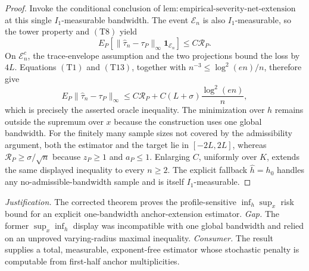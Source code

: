 \documentclass{article}
\begin{document}
\begin{proof}
Invoke the conditional conclusion of
\(\mathrm{lem{:}empirical\text{-}severity\text{-}net\text{-}extension}\)
at this single \(I_1\)-measurable bandwidth.  The event \(\mathcal E_n\) is
also \(I_1\)-measurable, so the tower property and \((\mathrm{T8})\) yield
\[
 E_P\!\left[\|\widehat\tau_n-\tau_P\|_\infty
 \mathbf1_{\mathcal E_n}\right]
 \leq C\mathcal R_P.
 \tag{T13}
\]
On \(\mathcal E_n^c\), the trace-envelope assumption and the two
projections bound the loss by \(4L\).  Equations \((\mathrm{T1})\) and
\((\mathrm{T13})\), together with
\(n^{-3}\leq\log^2(en)/n\), therefore give
\[
 E_P\|\widehat\tau_n-\tau_P\|_\infty
 \leq C\mathcal R_P+C(L+\sigma)\frac{\log^2(en)}{n},
\]
which is precisely the asserted oracle inequality.  The minimization over
\(h\) remains outside the supremum over \(x\) because the construction uses
one global bandwidth.  For the finitely many sample sizes not covered by the
admissibility argument, both the estimator and the target lie in
\([-2L,2L]\), whereas \(\mathcal R_P\geq\sigma/\sqrt n\) because
\(z_P\geq1\) and \(a_P\leq1\).  Enlarging \(C\), uniformly over \(K\),
extends the same displayed inequality to every \(n\geq2\).  The explicit
fallback \(\widehat h=h_0\) handles any no-admissible-bandwidth sample and
is itself \(I_1\)-measurable.
\end{proof}
\par\smallskip\noindent \textit{Justification.} The corrected theorem proves the profile-sensitive \(\inf_h\sup_x\) risk bound for an explicit one-bandwidth anchor-extension estimator. \textit{Gap.} The former \(\sup_x\inf_h\) display was incompatible with one global bandwidth and relied on an unproved varying-radius maximal inequality. \textit{Consumer.} The result supplies a total, measurable, exponent-free estimator whose stochastic penalty is computable from first-half anchor multiplicities.
\end{document}
